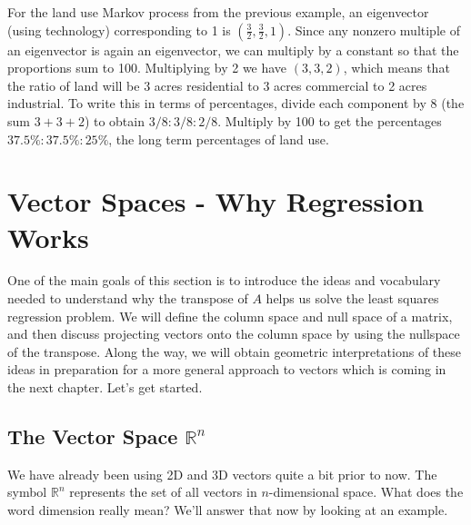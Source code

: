 \begin{example}
For the land use Markov process from the previous example, an eigenvector (using technology) corresponding to 1 is $\left(\frac{3}{2},\frac32,1\right)$. 
Since any nonzero multiple of an eigenvector is again an eigenvector, we can multiply by a constant so that the proportions sum to 100. 
Multiplying by 2 we have $(3,3,2)$, which means that the ratio of land will be 3 acres residential to 3 acres commercial to 2 acres industrial. 
To write this in terms of percentages, divide each component by 8 (the sum $3+3+2$) to obtain $3/8:3/8:2/8$. Multiply by 100 to get the percentages $37.5\%:37.5\%:25\%$, the long term percentages of land use.
\end{example}













\section{Vector Spaces - Why Regression Works}

One of the main goals of this section is to introduce the ideas and vocabulary needed to understand why the transpose of $A$ helps us solve the least squares regression problem. We will define the column space and null space of a matrix, and then discuss projecting vectors onto the column space by using the nullspace of the transpose.  Along the way, we will obtain geometric interpretations of these ideas in preparation for a more general approach to vectors which is coming in the next chapter.  Let's get started.

\subsection{The Vector Space ${\mathbb{R}}^n$}

We have already been using 2D and 3D vectors quite a bit prior to now.  The symbol $\mathbb{R}^n$ represents the set of all vectors in $n$-dimensional space.  What does the word dimension really mean? We'll answer that now by looking at an example.

